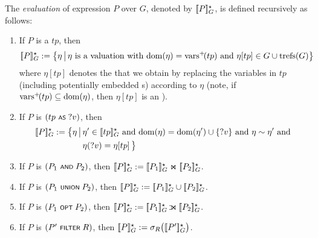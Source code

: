 \noindent
%
	The \emph{evaluation} of {\SPARQLplus} expression $P$ over {\RDFplusGraph} $G$,
denoted by $[\![P]\!]^\star_{G}$, is defined recursively as follows:
\begin{enumerate}
	\item If $P$ is a {\TPplus} $tp$, then
		\begin{equation*}
			[\![P]\!]^\star_{G} := \big\lbrace \eta \,\big|\,
				\eta \text{ is a valuation with } \mathrm{dom}(\eta) = \mathrm{vars}^+\!(tp)
				\text{ and } \eta[tp] \in G \cup \mathrm{trefs}(G)
			\big\rbrace
		\end{equation*}
		where $\eta[tp]$ denotes the {\TPplus} that we obtain by replacing the variables in $tp$ (including potentially embedded {\TPplus}s) according to $\eta$ (note, if $\mathrm{vars}^+\!(tp) \subseteq \mathrm{dom}(\eta)$, then $\eta[tp]$ is an {\RDFplusTriple}).
		\vspace{1ex} %
	\item If $P$ is $(tp \text{ \normalfont\scriptsize\textsf{AS} } ?v)$, then
		\begin{align*}
			\fctEvalPlus{P}{G} := \big\lbrace \eta \,\big|\,
				& \eta' \in \fctEvalPlus{tp}{G} 
				\text{ and } %
					\fctDom{\eta} = \fctDom{\eta'}\cup \lbrace ?v \rbrace
				\text{ and } \eta \compatible \eta' \text{ and }\\
				& \eta(?v) = \eta[tp] \,
			\big\rbrace
		\end{align*}
	\item If $P$ is $(P_1 \text{ \normalfont\scriptsize\textsf{AND} } P_2)$, then $[\![P]\!]^\star_{G} := [\![P_1]\!]^\star_{G} \Join [\![P_2]\!]^\star_{G}$.
	\item If $P$ is $(P_1 \text{ \normalfont\scriptsize\textsf{UNION} } P_2)$, then $[\![P]\!]^\star_{G} := [\![P_1]\!]^\star_{G} \cup [\![P_2]\!]^\star_{G}$.
	\item If $P$ is $(P_1 \text{ \normalfont\scriptsize\textsf{OPT} } P_2)$, then $\fctEvalPlus{P}{G} := \fctEvalPlus{P_1}{G} \LJoin \fctEvalPlus{P_2}{G}$.
	\item If $P$ is $(P' \text{ \normalfont\scriptsize\textsf{FILTER} } R)$, then $[\![P]\!]^\star_{G} := \sigma_R\bigl( [\![P']\!]^\star_{G} \bigr)$.
\end{enumerate}

